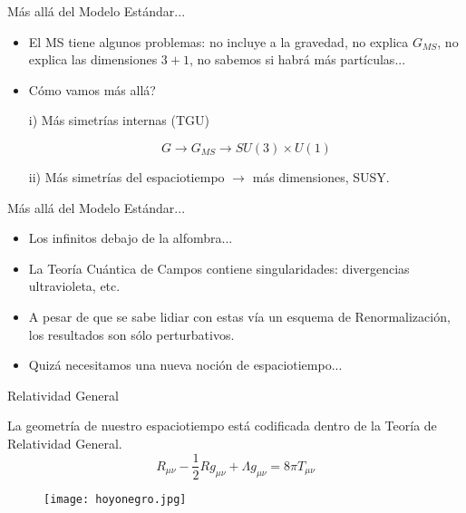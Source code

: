 \documentclass{beamer}
\begin{document}
\begin{frame}{Más allá del Modelo Estándar...}

\begin{itemize}
  \item
   El MS tiene algunos problemas: no incluye a la gravedad, no explica $G_{MS}$, no explica las dimensiones $3+1$, no sabemos si habrá más partículas...
  
    \item Cómo vamos más allá?
    \begin{exampleblock}{}
i) Más simetrías internas (TGU)

\[
G \to G_{MS} \to SU(3) \times U(1)
\]

ii) Más simetrías del espaciotiempo $\to$ más dimensiones, SUSY. 
 
\end{exampleblock}
   \end{itemize} 
\end{frame}

\begin{frame}{Más allá del Modelo Estándar...}

\begin{itemize}
   \item Los infinitos debajo de la alfombra...
   \vspace{5mm}
   \item La Teoría Cuántica de Campos contiene singularidades: divergencias ultravioleta, etc.
   \vspace{5mm}
   \item A pesar de que se sabe lidiar con estas vía un esquema de Renormalización, los resultados son sólo perturbativos.
   \vspace{5mm}
\item 
Quizá necesitamos una nueva noción de espaciotiempo...
   \end{itemize} 
\end{frame}


\begin{frame}{Relatividad General}

\begin{exampleblock}{}
La geometría de nuestro espaciotiempo está codificada dentro de la Teoría de Relatividad General.
\[
R_{\mu \nu} - \frac{1}{2} R g_{\mu \nu} + \Lambda g_{\mu \nu}= 8 \pi T_{\mu \nu} 
\]
\end{exampleblock}
\begin{figure}
\texttt{[image: hoyonegro.jpg]}
\end{figure}
\end{frame}
\end{document}
